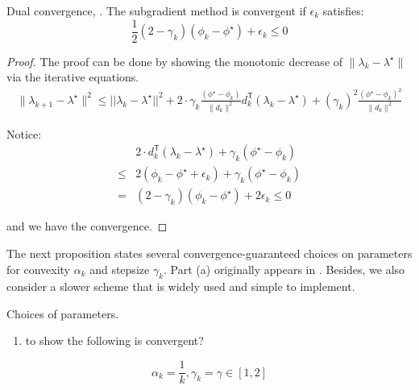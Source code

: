 \documentclass[../main]{subfiles}
\begin{document}
\begin{lemma} \label{lemma:dual_conv} Dual convergence, \cite{brannlund1995generalized}. The
  subgradient method is convergent if \(\epsilon_k\) satisfies:
  \begin{equation}
    \frac{1}{2}(2 - \gamma_k) (\phi_{k} - \phi^\star)  + \epsilon_k \le 0
  \end{equation}
\end{lemma}
\begin{proof}
  The proof can be done by showing the monotonic decrease of
  \(\|\lambda_{k} - \lambda^\star\|\) via the iterative equations.
  \begin{equation}\begin{aligned}
      \|\lambda_{k+1} - \lambda^\star\|^2 \le ||\lambda_k - \lambda^\star||^2
      + 2\cdot \gamma_k \frac{(\phi^\star - \phi_{k})}{\|d_{k}\|^{2}} d_k^\mathsf{T}(\lambda_k - \lambda^\star)
      + (\gamma_{k})^{2} \frac{(\phi^\star - \phi_{k})^{2}}{\|d_{k}\|^{2}}
    \end{aligned}\end{equation}

  Notice: \begin{equation}\begin{aligned}
          & 2  \cdot d_k^\mathsf{T}(\lambda_k - \lambda^\star) + \gamma_{k}(\phi^\star - \phi_{k}) \\
      \le & 2 (\phi_{k} - \phi^\star + \epsilon_k) + \gamma_k(\phi^\star -\phi_k)                  \\
      =   & (2 - \gamma_k) (\phi_{k} - \phi^\star)  + 2\epsilon_k \le 0
    \end{aligned}\end{equation}

  and we have the convergence.
\end{proof}

The next proposition states several convergence-guaranteed choices on
parameters for convexity \(\alpha_k\) and stepsize \(\gamma_k\). Part
(a) originally appears in \cite{brannlund1995generalized}. Besides, we
also consider a slower scheme that is widely used and simple to
implement.

\begin{corollary} Choices of parameters.

  \begin{enumerate}
    \def\labelenumi{(\alph{enumi})}
    \setcounter{enumi}{1}

    \item
          to show the following is convergent?
  \end{enumerate}

  \[\alpha_k = \frac{1}{k}, \gamma_k = \gamma \in [1, 2]\]


\end{corollary}
\end{document}
